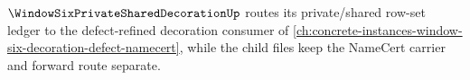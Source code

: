 $\WindowSixPrivateSharedDecorationUp$ routes its private/shared row-set ledger to the defect-refined decoration consumer of \autoref{ch:concrete-instances-window-six-decoration-defect-namecert}, while the child files keep the NameCert carrier and forward route separate.



